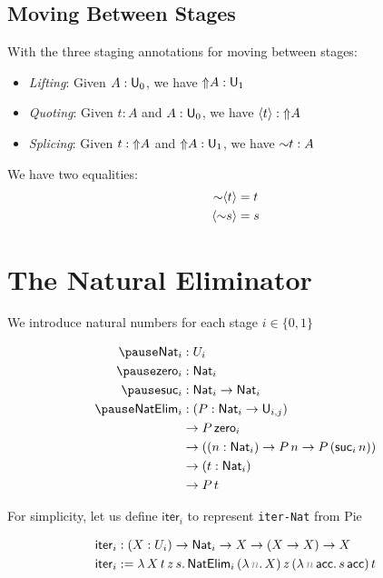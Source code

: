 \documentclass[handout]{beamer}
\newenvironment{fr}[1][]
{\begin{frame}[fragile,environment=fr,#1]}
{\end{frame}}
\begin{document}
\subsection{Moving Between Stages}
\begin{fr}{\subsecname}
    With the three staging annotations for moving between stages:
    \begin{itemize}
        \item \emph{Lifting}: Given $A : \mathsf{U}_0$, we have ${\Uparrow} A : \mathsf{U}_1$
        \item \emph{Quoting}: Given $t:A$ and $A:\mathsf{U}_0$, we have $\langle t\rangle:{\Uparrow} A$
        \item \emph{Splicing}: Given $t:{\Uparrow} A$ and ${\Uparrow} A: \mathsf{U}_1$, we have ${\sim} t: A$
    \end{itemize}
    We have two equalities:
    $$\begin{aligned}
        {\sim} \langle t\rangle &= t\\
        \langle {\sim} s\rangle &= s
    \end{aligned}$$
\end{fr}


\section{The Natural Eliminator}
\begin{fr}{\secname}

We introduce natural numbers for each stage $i\in\{0,1\}$

\begin{align*}
    \pause\mathsf{Nat}_i&:U_i\\
    \pause\mathsf{zero}_i&:\mathsf{Nat}_i\\
    \pause\mathsf{suc}_i&:\mathsf{Nat}_i\to\mathsf{Nat}_i\\
    \pause\mathsf{NatElim}_i&:(P:\mathsf{Nat}_i\to\mathsf{U}_{i,j})\\
    &\to P\,\mathsf{zero}_i\\
    &\to ((n:\mathsf{Nat}_i)\to P\,n\to P\,(\mathsf{suc}_i\,n))\\
    &\to(t:\mathsf{Nat}_i)\\
    &\to P\,t\\
\end{align*}

\pause

For simplicity, let us define $\mathsf{iter}_i$ to represent \texttt{iter-Nat} from Pie

\begin{align*}
    \mathsf{iter}_i&:(X:U_i)\to\mathsf{Nat}_i\to X\to (X\to X)\to X\\
    \mathsf{iter}_i&:=\lambda\,X\,t\,z\,s.\,\mathsf{NatElim}_i\,(\lambda\,\gray n.\,X)\,z\,(\lambda\,\gray n\,\mathsf{acc}.\,s\,\mathsf{acc})\,t\\
\end{align*}

\end{fr}
\end{document}
